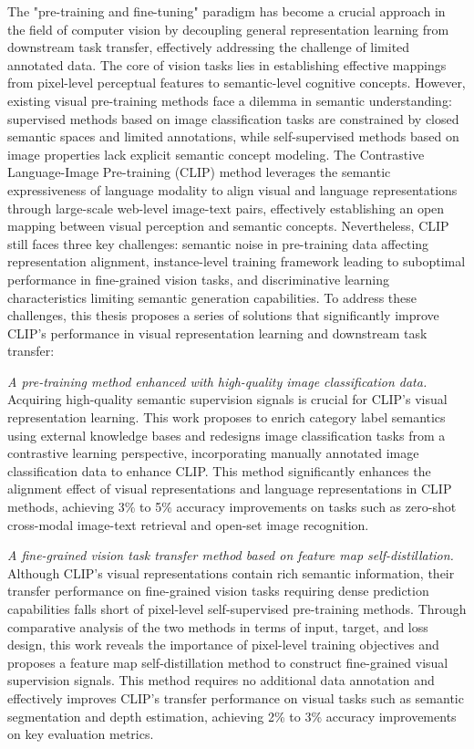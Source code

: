 \begin{abstract*}
The "pre-training and fine-tuning" paradigm has become a crucial approach in the field of computer vision by decoupling general representation learning from downstream task transfer, effectively addressing the challenge of limited annotated data. The core of vision tasks lies in establishing effective mappings from pixel-level perceptual features to semantic-level cognitive concepts. However, existing visual pre-training methods face a dilemma in semantic understanding: supervised methods based on image classification tasks are constrained by closed semantic spaces and limited annotations, while self-supervised methods based on image properties lack explicit semantic concept modeling. The Contrastive Language-Image Pre-training (CLIP) method leverages the semantic expressiveness of language modality to align visual and language representations through large-scale web-level image-text pairs, effectively establishing an open mapping between visual perception and semantic concepts. Nevertheless, CLIP still faces three key challenges: semantic noise in pre-training data affecting representation alignment, instance-level training framework leading to suboptimal performance in fine-grained vision tasks, and discriminative learning characteristics limiting semantic generation capabilities. To address these challenges, this thesis proposes a series of solutions that significantly improve CLIP's performance in visual representation learning and downstream task transfer:

\textit{A pre-training method enhanced with high-quality image classification data.} Acquiring high-quality semantic supervision signals is crucial for CLIP's visual representation learning. This work proposes to enrich category label semantics using external knowledge bases and redesigns image classification tasks from a contrastive learning perspective, incorporating manually annotated image classification data to enhance CLIP. This method significantly enhances the alignment effect of visual representations and language representations in CLIP methods, achieving 3\% to 5\% accuracy improvements on tasks such as zero-shot cross-modal image-text retrieval and open-set image recognition.

\textit{A fine-grained vision task transfer method based on feature map self-distillation.} Although CLIP's visual representations contain rich semantic information, their transfer performance on fine-grained vision tasks requiring dense prediction capabilities falls short of pixel-level self-supervised pre-training methods. Through comparative analysis of the two methods in terms of input, target, and loss design, this work reveals the importance of pixel-level training objectives and proposes a feature map self-distillation method to construct fine-grained visual supervision signals. This method requires no additional data annotation and effectively improves CLIP's transfer performance on visual tasks such as semantic segmentation and depth estimation, achieving 2\% to 3\% accuracy improvements on key evaluation metrics.


\end{abstract*}

